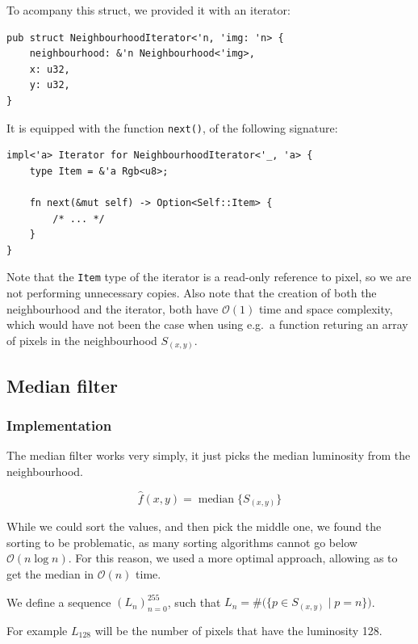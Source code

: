 \documentclass[12pt]{article}
\theoremstyle{definition}
\DeclareMathOperator*{\median}{median}
\begin{document}
To acompany this struct, we provided it with an iterator:

\begin{lstlisting}
pub struct NeighbourhoodIterator<'n, 'img: 'n> {
    neighbourhood: &'n Neighbourhood<'img>,
    x: u32,
    y: u32,
}
\end{lstlisting}

It is equipped with the function \lstinline{next()}, of the following signature:

\begin{lstlisting}
impl<'a> Iterator for NeighbourhoodIterator<'_, 'a> {
    type Item = &'a Rgb<u8>;

    fn next(&mut self) -> Option<Self::Item> {
        /* ... */
    }
}
\end{lstlisting}

Note that the \lstinline{Item} type of the iterator is a read-only reference to pixel, so we are not performing unnecessary copies.
Also note that the creation of both the neighbourhood and the iterator, both have $\mathcal{O}(1)$ time and space complexity, 
which would have not been the case when using e.g.\ a function returing an array of pixels in the neighbourhood $S_{(x,y)}$.

\subsection{Median filter}

\subsubsection{Implementation}\label{sec:median-impl}

The median filter works very simply, it just picks the median luminosity from the neighbourhood.

\begin{equation}
    \hat{f}(x,y) = \median \big\{ S_{(x,y)} \big\}
\end{equation}

While we could sort the values, and then pick the middle one,
we found the sorting to be problematic, as many sorting algorithms cannot go below $\mathcal{O}(n \log n)$.
For this reason, we used a more optimal approach, allowing as to get the median in $\mathcal{O}(n)$ time.

We define a sequence $(L_n)_{n=0}^{255}$, such that $L_n = \#\big(\{p \in S_{(x,y)} \mid p = n\}\big)$.

For example $L_{128}$ will be the number of pixels that have the luminosity 128.
\end{document}
